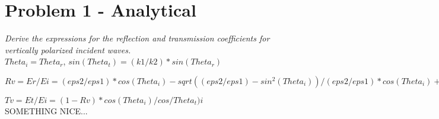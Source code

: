 \section{Problem 1 - Analytical}
\textit{Derive the expressions for the reflection and transmission coefficients for vertically polarized incident waves.}\\

$Theta_i=Theta_r$, $sin(Theta_t)=(k1/k2)*sin(Theta_r)$

$Rv=Er/Ei={(eps2/eps1)*cos(Theta_i)-sqrt((eps2/eps1)-sin^2(Theta_i))}/{(eps2/eps1)*cos(Theta_i)+sqrt((eps2/eps1)-sin^2(Theta_i))}$

$Tv=Et/Ei=(1-Rv)*cos(Theta_i)/cos/Theta_t)i$\\

SOMETHING NICE...